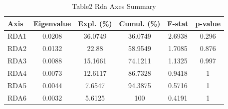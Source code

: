 
\begin{table}[htbp]
    \centering
    \small
    \caption{Table2 Rda Axes Summary}
    \label{tab:table2_rda_axes_summary}
    \begin{tabular}{lccccc}
        \toprule
        Axis & Eigenvalue & Expl. (\%) & Cumul. (\%) & F-stat & p-value \\
        \midrule
        RDA1 & 0.0208 & 36.0749 & 36.0749 & 2.6938 & 0.296 \\
        RDA2 & 0.0132 & 22.88 & 58.9549 & 1.7085 & 0.876 \\
        RDA3 & 0.0088 & 15.1661 & 74.1211 & 1.1325 & 0.997 \\
        RDA4 & 0.0073 & 12.6117 & 86.7328 & 0.9418 & 1 \\
        RDA5 & 0.0044 & 7.6547 & 94.3875 & 0.5716 & 1 \\
        RDA6 & 0.0032 & 5.6125 & 100 & 0.4191 & 1 \\
        \bottomrule
    \end{tabular}
\end{table}

